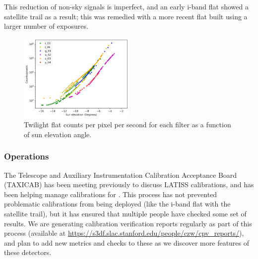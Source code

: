 This reduction of non-sky signals is imperfect, and an early i-band flat showed a satellite trail as a
result; this was remedied with a more recent flat built using a larger number of exposures.


\begin{figure}
  \centering
  \includegraphics[width=0.5\textwidth]{calibration_data_figures/twilight_flat_counts.png}
  \caption{Twilight flat counts per pixel per second for each filter as a function of sun elevation angle.}
  \label{fig:twilight_counts}
\end{figure}

\subsubsection{Operations}

The Telescope and Auxiliary Instrumentation Calibration Acceptance Board (TAXICAB) has been meeting previously to discuss LATISS calibrations, and has been helping manage calibrations for \ComCam.
This process has not prevented problematic calibrations from being deployed (like the i-band flat with the satellite trail), but it has ensured that multiple people have checked some set of results.
We are generating calibration verification reports regularly as part of this process (available at \url{https://s3df.slac.stanford.edu/people/czw/cpv_reports/}), and plan to add new metrics and checks to these as we discover more features of these detectors.
